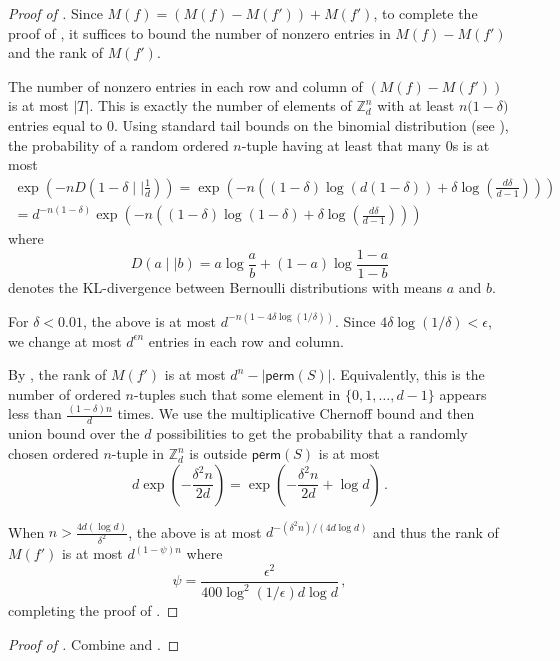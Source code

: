 \documentclass{toc}
\renewcommand\Z{{\mathbb{Z}}}
\newcommand\perm{\textsf{perm}}
\begin{document}
\begin{proof}[Proof of ] Since $M(f) = (M(f) - M(f')) + M(f')$, to complete the proof of , it suffices to bound the number of nonzero entries in $M(f) - M(f')$ and the rank of $M(f')$.

The number of nonzero entries in each row and column of $(M(f) - M(f'))$ is at most $|T|$.  This is exactly the number of elements of $\Z_d^n$ with at least $n\big(1- \delta \big)$ entries equal to $0$.  Using standard tail bounds on the binomial distribution (see \cite{binomial_tails}), the probability of a random ordered $n$-tuple having at least that many $0$s is at most
%
%
%
%
\begin{align*}
\exp\left(-nD\left(1-\delta \mid \mid \frac{1}{d}\right)\right) = \exp\left(-n \left( (1- \delta) \log (d(1-\delta)) + \delta \log\left(\frac{d\delta}{d-1}\right)\right)\right) \\ 
= d^{-n(1-\delta)}\exp\left(-n\left((1-\delta) \log(1-\delta) + \delta \log\left(\frac{d\delta}{d-1}\right)\right)\right)
\end{align*}
%
where %
\[
D(a \mid \mid b) = a \log \frac{a}{b} + (1-a) \log \frac{1-a}{1-b} 
\]
denotes the KL-divergence between Bernoulli distributions with means $a$ and $b$.
%
 
 For $\delta < 0.01$, the above is at most $d^{-n(1- 4\delta \log (1/\delta))}$.  Since $4\delta \log (1/\delta) < \epsilon$, we change at most $d^{ \epsilon n}$ entries in each row and column.


By , the rank of $M(f')$ is at most $d^n - |\perm(S)|$.  Equivalently, this is the number of ordered $n$-tuples such that some element in $\{0,1, \dots , d-1 \}$ appears less than $ \frac{(1-\delta)n}{d}$ times.  We use the multiplicative Chernoff bound and then union bound over the $d$ possibilities to get the probability that a randomly chosen ordered $n$-tuple in $\Z_d^n$ is outside $\perm(S)$ is at most
\[
d\exp\left(-\frac{\delta^2n}{2d}\right)  = \exp\left(-\frac{\delta^2n}{2d} + \log d\right) \,.
\]

When $n > \frac{4d(\log d)}{\delta^2}$, the above is at most $d^{-(\delta^2 n)/(4 d \log d)}$ and thus the rank of $M(f')$ is at most  
$d^{(1- \psi)n}$
where 
\[
\psi = \frac{\epsilon^2 }{400 \log^2 (1/\epsilon) d \log d} \,,
\]
completing the proof of .
\end{proof}

\begin{proof}[Proof of ]
%
%
%
Combine  and . %
\end{proof}
\end{document}
